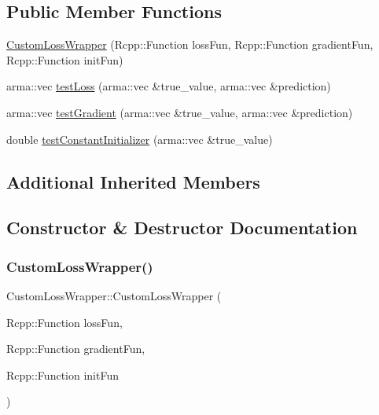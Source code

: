 \subsection*{Public Member Functions}
\begin{DoxyCompactItemize}
\item 
\mbox{\hyperlink{class_custom_loss_wrapper_a01d59e42a06ae2b14ba1c90bf705817d}{Custom\+Loss\+Wrapper}} (Rcpp\+::\+Function loss\+Fun, Rcpp\+::\+Function gradient\+Fun, Rcpp\+::\+Function init\+Fun)
\item 
arma\+::vec \mbox{\hyperlink{class_custom_loss_wrapper_a6430fb3e6c2cfaea13e64645ab80d8b7}{test\+Loss}} (arma\+::vec \&true\+\_\+value, arma\+::vec \&prediction)
\item 
arma\+::vec \mbox{\hyperlink{class_custom_loss_wrapper_a177d367857efffc9904b5e38ed4333d1}{test\+Gradient}} (arma\+::vec \&true\+\_\+value, arma\+::vec \&prediction)
\item 
double \mbox{\hyperlink{class_custom_loss_wrapper_a43d8b3e4c68d7662cff73a0301542815}{test\+Constant\+Initializer}} (arma\+::vec \&true\+\_\+value)
\end{DoxyCompactItemize}
\subsection*{Additional Inherited Members}


\subsection{Constructor \& Destructor Documentation}
\mbox{\label{class_custom_loss_wrapper_a01d59e42a06ae2b14ba1c90bf705817d}} 
\subsubsection{\texorpdfstring{Custom\+Loss\+Wrapper()}{CustomLossWrapper()}}
{\footnotesize\ttfamily Custom\+Loss\+Wrapper\+::\+Custom\+Loss\+Wrapper (\begin{DoxyParamCaption}\item[{Rcpp\+::\+Function}]{loss\+Fun,  }\item[{Rcpp\+::\+Function}]{gradient\+Fun,  }\item[{Rcpp\+::\+Function}]{init\+Fun }\end{DoxyParamCaption})\hspace{0.3cm}{\ttfamily [inline]}}



